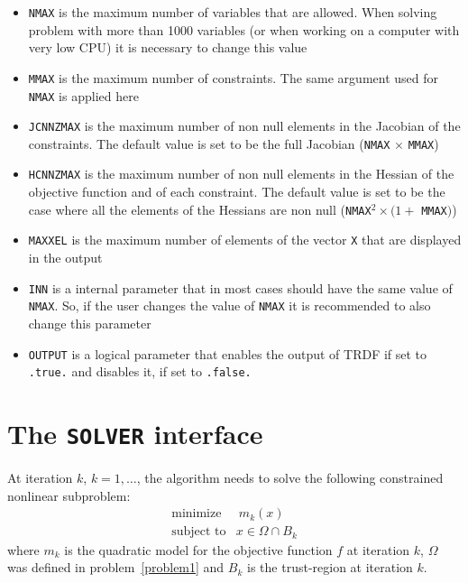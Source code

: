 \documentclass[12pt]{article}
\begin{document}
\begin{itemize}
\item \texttt{NMAX} is the maximum number of variables that are
  allowed. When solving problem with more than 1000 variables (or when
  working on a computer with very low CPU) it is necessary to change
  this value

\item \texttt{MMAX} is the maximum number of constraints. The same
  argument used for \texttt{NMAX} is applied here

\item \texttt{JCNNZMAX} is the maximum number of non null elements in
  the Jacobian of the constraints. The default value is set to be the
  full Jacobian (\texttt{NMAX} $\times$ \texttt{MMAX})

\item \texttt{HCNNZMAX} is the maximum number of non null elements in
  the Hessian of the objective function and of each constraint. The
  default value is set to be the case where all the elements of the
  Hessians are non null (\texttt{NMAX}$^2 \times (1 + $
  \texttt{MMAX}$)$)

\item \texttt{MAXXEL} is the maximum number of elements of the vector
  \texttt{X} that are displayed in the output

\item \texttt{INN} is a internal parameter that in most cases should
  have the same value of \texttt{NMAX}. So, if the user changes the
  value of \texttt{NMAX} it is recommended to also change this
  parameter

\item \texttt{OUTPUT} is a logical parameter that enables the output
  of TRDF if set to \texttt{.true.} and disables it, if set to
  \texttt{.false.}
\end{itemize}

\section{The \texttt{SOLVER} interface}
\label{solver}

At iteration $k$, $k = 1,\dots$, the algorithm needs to solve the
following constrained nonlinear subproblem:
\begin{equation}
  \label{problem2}
  \begin{array}{ll}
    \text{minimize}  & \ m_k(x)\\
    \mbox{subject to} & x\in\Omega \cap B_k
  \end{array}\end{equation}
where $m_k$ is the quadratic model for the objective function $f$ at
iteration $k$, $\Omega$ was defined in problem~\eqref{problem1} and
$B_k$ is the trust-region at iteration $k$.
\end{document}
